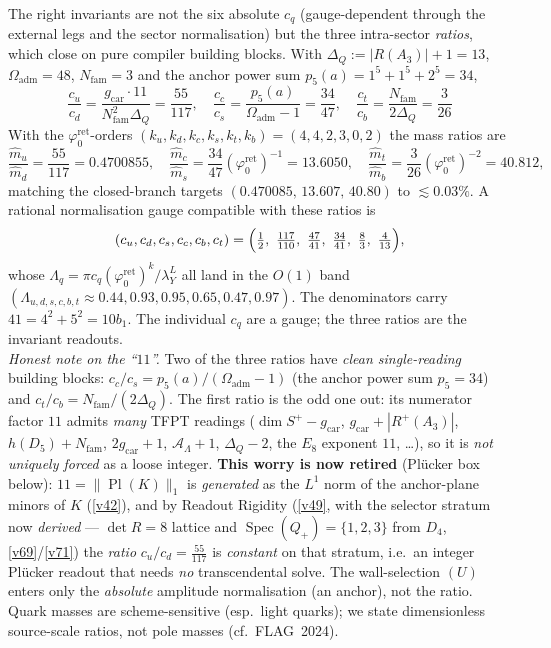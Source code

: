 \documentclass[11pt,a4paper]{article}
\newcommand{\gcar}{g_{\mathrm{car}}}
\newcommand{\Nfam}{N_{\mathrm{fam}}}
\newcommand{\phiz}{\varphi_0^{\mathrm{ret}}}
\theoremstyle{definition}
\begin{document}
\begin{keybox}
The right invariants are not the six absolute $c_q$ (gauge-dependent through the external legs and the
sector normalisation) but the three intra-sector \emph{ratios}, which close on pure compiler building
blocks. With $\Delta_Q:=|R(A_3)|{+}1=13$, $\Omega_{\mathrm{adm}}=48$, $\Nfam=3$ and the anchor power sum
$p_5(a)=1^5{+}1^5{+}2^5=34$,
\[
  \boxed{\
  \frac{c_u}{c_d}=\frac{\gcar\cdot 11}{\Nfam^{2}\Delta_Q}=\frac{55}{117},\quad
  \frac{c_c}{c_s}=\frac{p_5(a)}{\Omega_{\mathrm{adm}}-1}=\frac{34}{47},\quad
  \frac{c_t}{c_b}=\frac{\Nfam}{2\Delta_Q}=\frac{3}{26}\ }
\]
With the $\phiz$-orders $(k_u,k_d,k_c,k_s,k_t,k_b)=(4,4,2,3,0,2)$ the mass ratios are
\[
  \frac{\hat m_u}{\hat m_d}=\frac{55}{117}=0.4700855,\quad
  \frac{\hat m_c}{\hat m_s}=\frac{34}{47}(\phiz)^{-1}=13.6050,\quad
  \frac{\hat m_t}{\hat m_b}=\frac{3}{26}(\phiz)^{-2}=40.812,
\]
matching the closed-branch targets $(0.470085,\,13.607,\,40.80)$ to $\lesssim0.03\%$. A rational
normalisation gauge compatible with these ratios is
\[
  (c_u,c_d,c_s,c_c,c_b,c_t)=\Bigl(\tfrac12,\ \tfrac{117}{110},\ \tfrac{47}{41},\ \tfrac{34}{41},\ \tfrac83,\ \tfrac4{13}\Bigr),
\]
whose $\Lambda_q=\pi c_q(\phiz)^{k}/\lambda_Y^{L}$ all land in the $O(1)$ band
$(\Lambda_{u,d,s,c,b,t}\approx 0.44,0.93,0.95,0.65,0.47,0.97)$. The denominators carry $41=4^2{+}5^2=10b_1$.
The individual $c_q$ are a gauge; the three ratios are the invariant readouts. 
\smallskip\\
\noindent\emph{Honest note on the ``$11$''.} Two of the three ratios have \emph{clean single-reading}
building blocks: $c_c/c_s=p_5(a)/(\Omega_{\mathrm{adm}}{-}1)$ (the anchor power sum $p_5{=}34$) and
$c_t/c_b=\Nfam/(2\Delta_Q)$. The first ratio is the odd one out: its numerator factor $11$ admits
\emph{many} TFPT readings ($\dim S^+{-}\gcar$, $\gcar{+}|R^+(A_3)|$, $h(D_5){+}\Nfam$, $2\gcar{+}1$,
$\mathcal A_\Lambda{+}1$, $\Delta_Q{-}2$, the $E_8$ exponent $11$, \dots), so it is \emph{not uniquely
forced} as a loose integer. \textbf{This worry is now retired} (Plücker box below): $11=\|\operatorname{Pl}(K)\|_1$
is \emph{generated} as the $L^1$ norm of the anchor-plane minors of $K$ (\vref{v42}), and by Readout Rigidity (\vref{v49},
with the selector stratum now \emph{derived} --- $\det R=8$ lattice and $\operatorname{Spec}(Q_+)=\{1,2,3\}$
from $D_4$, \vref{v69}/\vref{v71}) the \emph{ratio} $c_u/c_d=\tfrac{55}{117}$ is \emph{constant} on that stratum, i.e.\ an
integer Pl\"ucker readout that needs \emph{no} transcendental solve. The wall-selection $(U)$ enters only the
\emph{absolute} amplitude normalisation (an anchor), not the ratio. 
Quark masses are scheme-sensitive (esp.\ light quarks); we state dimensionless source-scale ratios, not pole
masses (cf.\ FLAG~2024).
\end{keybox}
\end{document}
